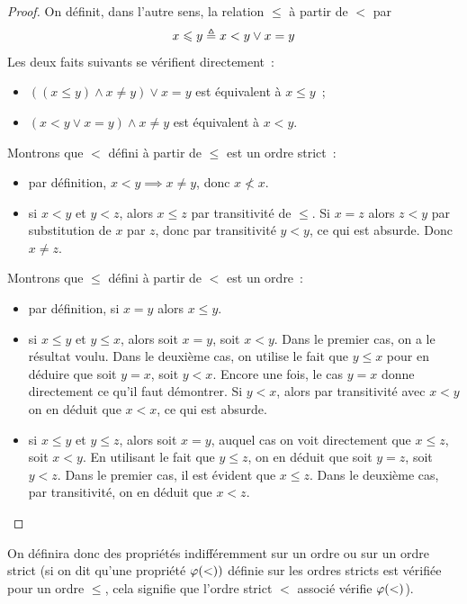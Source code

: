 \begin{proof}
  On définit, dans l'autre sens, la relation $\leq$ à partir de $<$ par
  \[x\leqslant y \triangleq x < y \lor x = y\]
  Les deux faits suivants se vérifient directement~:
  \begin{itemize}
  \item  $((x \leq y)\land x \neq y) \lor x = y$ est équivalent à $x\leq y$~;
  \item $(x < y\lor x = y) \land x \neq y$ est équivalent à $x < y$.
  \end{itemize}

  Montrons que $<$ défini à partir de $\leq$ est un ordre strict~:
  \begin{itemize}
  \item par définition, $x < y\implies x \neq y$, donc $x\not< x$.
  \item si $x < y$ et $y < z$, alors $x \leq z$ par transitivité de $\leq$.
    Si $x = z$ alors $z < y$ par substitution de $x$ par $z$, donc par
    transitivité $y < y$, ce qui est absurde. Donc $x \neq z$.
  \end{itemize}

  Montrons que $\leq$ défini à partir de $<$ est un ordre~:
  \begin{itemize}
  \item par définition, si $x = y$ alors $x\leq y$.
  \item si $x\leq y$ et $y\leq x$, alors soit $x = y$, soit $x < y$. Dans le
    premier cas, on a le résultat voulu. Dans le deuxième cas, on utilise le
    fait que $y\leq x$ pour en déduire que soit $y = x$, soit $y < x$. Encore
    une fois, le cas $y = x$ donne directement ce qu'il faut démontrer.
    Si $y < x$, alors par transitivité avec $x < y$ on en déduit que $x < x$,
    ce qui est absurde.
  \item si $x \leq y$ et $y \leq z$, alors soit $x = y$, auquel cas on voit
    directement que $x\leq z$, soit $x < y$. En utilisant le fait que
    $y \leq z$, on en déduit que soit $y = z$, soit $y < z$. Dans le premier
    cas, il est évident que $x \leq z$. Dans le deuxième cas, par transitivité,
    on en déduit que $x < z$.\qedhere
  \end{itemize}
\end{proof}

On définira donc des propriétés indifféremment sur un ordre ou sur un ordre
strict (si on dit qu'une propriété $\varphi(\mathord{<}))$ définie sur les ordres
stricts est vérifiée pour un ordre $\leq$, cela signifie que l'ordre strict $<$
associé vérifie $\varphi(<)$).

